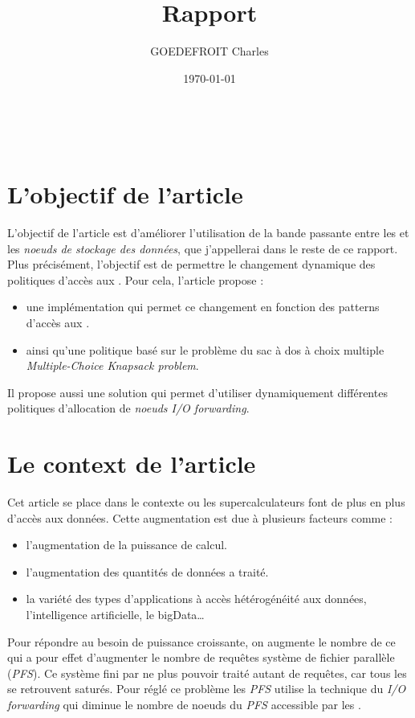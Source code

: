 \documentclass[10pt, a4paper]{article}
\title{Rapport}
\author{GOEDEFROIT Charles}
\date{\today}
\begin{document}
\begin{titlepage}
	\centering
  \ {} %
	\vfill
	\vspace{1cm}
	{\scshape\Huge\MyTitle\par}
	\vspace{0.5cm}
	{\Large\MySubject\par}
	\vspace{1cm}
	\MyAuthor
	\vfill
	{\large\MyDate\par}
\end{titlepage}

\newpage

\section{L'objectif de l'article}

L'objectif de l'article est d'améliorer l'utilisation de la bande passante entre les \noeudsDeCalculs{} et les \emph{noeuds de stockage des données}, que j'appellerai \noeudsIO{} dans le reste de ce rapport. Plus précisément, l'objectif est de permettre le changement dynamique des politiques d'accès aux \noeudsIO{}. Pour cela, l'article propose :
\begin{itemize}
  \item une implémentation qui permet ce changement en fonction des patterns d'accès aux \noeudsIO{}.
  \item ainsi qu'une politique basé sur le problème du sac à dos à choix multiple \emph{Multiple-Choice Knapsack problem}.
\end{itemize}

Il propose aussi une solution qui permet d'utiliser dynamiquement différentes politiques d'allocation de \emph{noeuds I/O forwarding}.

\section{Le context de l'article}

Cet article se place dans le contexte ou les supercalculateurs font de plus en
plus d'accès aux données. Cette augmentation est due à plusieurs facteurs comme :
\begin{itemize}
  \item l'augmentation de la puissance de calcul.
  \item l'augmentation des quantités de données a traité.
  \item la variété des types d'applications à accès hétérogénéité aux données, l'intelligence artificielle, le bigData\dots
\end{itemize}
Pour répondre au besoin de puissance croissante, on augmente le nombre de \noeudsDeCalculs{} ce qui a pour effet d'augmenter le nombre de requêtes système de fichier parallèle (\emph{PFS}). Ce système fini par ne plus pouvoir traité autant de requêtes, car tous les \noeudsIO{} se retrouvent saturés. Pour réglé ce problème les \emph{PFS} utilise la technique du \emph{I/O forwarding} qui diminue le nombre de noeuds du \emph{PFS} accessible par les \noeudsDeCalculs{}.
\end{document}
